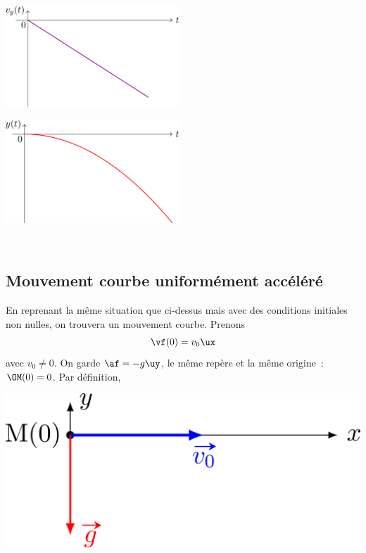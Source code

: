 \documentclass[../../main/main.tex]{subfiles}
\begin{document}
\hfill
\begin{minipage}{0.45\linewidth}
	\begin{center}
		\includegraphics[width=6.5cm]{nov_vy}
	\end{center}
\end{minipage}
\hfill
\begin{minipage}{0.45\linewidth}
	\begin{center}
		\includegraphics[width=6.5cm]{nov_y}
	\end{center}
\end{minipage}
\hfill~

\subsection{Mouvement courbe uniformément accéléré}
\noindent
\begin{minipage}{0.70\linewidth}
	En reprenant la même situation que ci-dessus mais avec des conditions
	initiales non nulles, on trouvera un mouvement courbe. Prenons
	\[\vf(0) = v_0\ux\]
	avec $v_0 \neq 0$. On garde $\af = -g \uy$, le même repère et la même
	origine~: $\OM(0) = 0$. Par définition,
\end{minipage}
\hfill
\begin{minipage}{0.23\linewidth}
	\begin{center}
		\includegraphics[width=\linewidth]{vo_init}
	\end{center}
\end{minipage}
\end{document}
